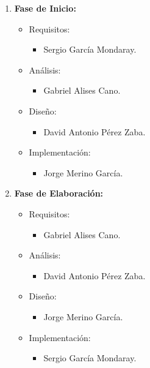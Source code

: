 \begin{enumerate}

\item \textbf{Fase de Inicio:}
  \begin{itemize}
  \item Requisitos:
    \begin{itemize}
    \item Sergio García Mondaray.
    \end{itemize}

  \item Análisis:
    \begin{itemize}
    \item Gabriel Alises Cano.
    \end{itemize}
    
  \item Diseño:
    \begin{itemize}
    \item David Antonio Pérez Zaba.
    \end{itemize}

 \item Implementación:
    \begin{itemize}
    \item Jorge Merino García.
    \end{itemize}
  \end{itemize}

\item \textbf{Fase de Elaboración:}
  \begin{itemize}
  \item Requisitos:
    \begin{itemize}
    \item Gabriel Alises Cano.
    \end{itemize}

  \item Análisis:
    \begin{itemize}
    \item David Antonio Pérez Zaba.
    \end{itemize}
    
  \item Diseño:
    \begin{itemize}
    \item Jorge Merino García.
    \end{itemize}

  \item Implementación:
    \begin{itemize}
    \item Sergio García Mondaray.
    \end{itemize}


\end{itemize}
\end{enumerate}
